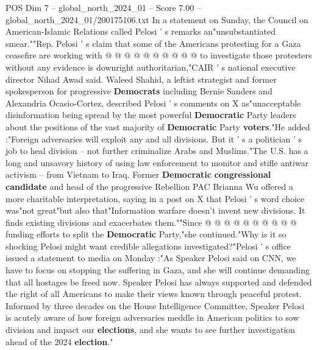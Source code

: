 \begin{textsample}{POS Dim 7 – global\_north\_2024\_01 – Score 7.00 – global\_north\_2024\_01/200175106.txt}
In a statement on Sunday, the Council on American-Islamic Relations called Pelosi ' s remarks an"unsubstantiated smear.""Rep.
Pelosi ' s claim that some of the Americans protesting for a Gaza ceasefire are working with @ @ @ @ @ @ @ @ @ @ to investigate those protesters without any evidence is downright authoritarian,"CAIR ' s national executive director Nihad Awad said.
Waleed Shahid, a leftist strategist and former spokesperson for progressive \textbf{Democrats} including Bernie Sanders and Alexandria Ocasio-Cortez, described Pelosi ' s comments on X as"unacceptable disinformation being spread by the most powerful \textbf{Democratic} Party leaders about the positions of the vast majority of \textbf{Democratic} Party \textbf{voters}."He added :"Foreign adversaries will exploit any and all divisions.
But it ' s a politician ' s job to heal division -- not further criminalize Arabs and Muslims."The U.S. has a long and unsavory history of using law enforcement to monitor and stifle antiwar activism -- from Vietnam to Iraq.
Former \textbf{Democratic} \textbf{congressional} \textbf{candidate} and head of the progressive Rebellion PAC Brianna Wu offered a more charitable interpretation, saying in a post on X that Pelosi ' s word choice was"not great"but also that"Information warfare doesn't invent new divisions.
It finds existing divisions and exacerbates them.""Since @ @ @ @ @ @ @ @ @ @ funding efforts to split the \textbf{Democratic} Party,"she continued."Why is it so shocking Pelosi might want credible allegations investigated?"Pelosi ' s office issued a statement to media on Monday :"As Speaker Pelosi said on CNN, we have to focus on stopping the suffering in Gaza, and she will continue demanding that all hostages be freed now.
Speaker Pelosi has always supported and defended the right of all Americans to make their views known through peaceful protest.
Informed by three decades on the House Intelligence Committee, Speaker Pelosi is acutely aware of how foreign adversaries meddle in American politics to sow division and impact our \textbf{elections}, and she wants to see further investigation ahead of the 2024 \textbf{election}."

\end{textsample}
